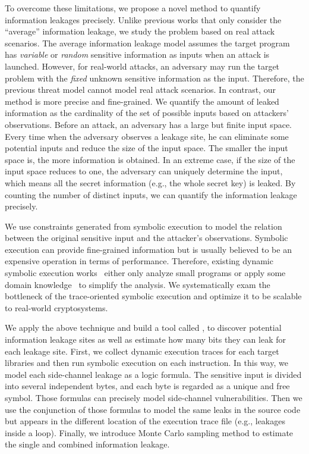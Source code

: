 To overcome these limitations, we propose a novel method to quantify information
leakages precisely. Unlike previous works that only consider the
``average'' information leakage, we study the problem based on real attack
scenarios. The average information leakage model assumes the target program has
\emph{variable} or \emph{random} sensitive information as inputs when an attack is
launched. However, for real-world attacks, an adversary may run the target
problem with the \emph{fixed} unknown sensitive information
as the input. Therefore, the previous threat model cannot model real attack
scenarios. In contrast, our method is more precise and fine-grained. 
We quantify
the amount of leaked information as the cardinality of the set of possible
inputs based on attackers' observations.
Before an attack, an adversary has a large but finite input space. Every time
when the adversary observes a leakage site, he can eliminate some potential
inputs and reduce the size of the input space. The smaller the input space is,
the more information is obtained. In an extreme case, if the size of the
input space reduces to one, the adversary can uniquely determine the input, 
which means all the secret information (e.g., the whole secret key) is
leaked. By counting the number of distinct inputs, we can quantify the
information leakage precisely.

We use constraints generated from symbolic execution to model the relation 
between the original sensitive input
and the attacker's observations. Symbolic execution can
provide fine-grained information but is usually believed to be an expensive
operation in terms of performance. Therefore, existing dynamic symbolic
execution works~\cite{203878,236338,Brotzman19Casym} either only analyze
small programs or apply some domain knowledge~\cite{203878} to simplify the analysis. We
systematically exam the bottleneck of the trace-oriented symbolic execution and optimize it
to be scalable to real-world cryptosystems.

We apply the above technique and build a tool called \tool{},
to discover potential information leakage sites as well as estimate how
many bits they can leak for each leakage site. 
First, we collect dynamic execution traces for each target
libraries and then run symbolic execution on each instruction. In this way, we model
each side-channel leakage as a logic formula. The sensitive input is divided into
several independent bytes, and each byte is regarded as a unique and free symbol. Those
formulas can precisely model side-channel vulnerabilities. Then we use the conjunction
of those formulas to model the same leaks in the source code but appears in the different location of
the execution trace file (e.g., leakages inside a loop).
Finally, we introduce Monte Carlo
sampling method to estimate the single and combined information leakage. 

